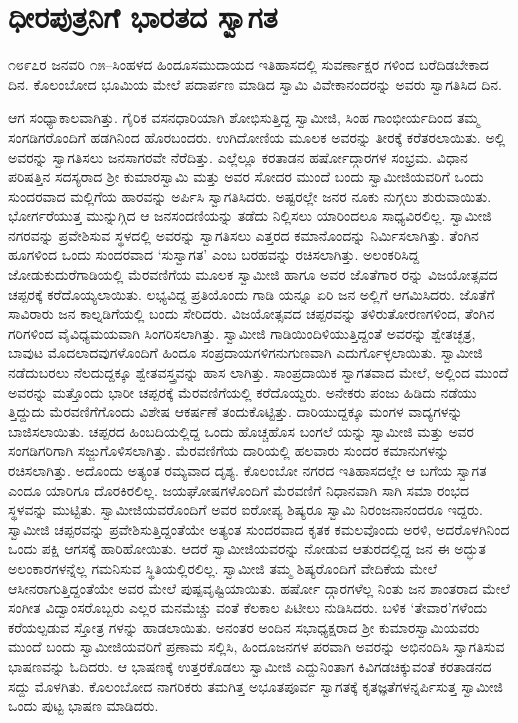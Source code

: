 
\chapter{ಧೀರಪುತ್ರನಿಗೆ ಭಾರತದ ಸ್ವಾಗತ}

\noindent

೧೮೯೭ರ ಜನವರಿ ೧೫–ಸಿಂಹಳದ ಹಿಂದೂಸಮುದಾಯದ ಇತಿಹಾಸದಲ್ಲಿ ಸುವರ್ಣಾಕ್ಷರ ಗಳಿಂದ ಬರೆದಿಡಬೇಕಾದ ದಿನ. ಕೊಲಂಬೋದ ಭೂಮಿಯ ಮೇಲೆ ಪದಾರ್ಪಣ ಮಾಡಿದ ಸ್ವಾಮಿ ವಿವೇಕಾನಂದರನ್ನು ಅವರು ಸ್ವಾಗತಿಸಿದ ದಿನ.

ಆಗ ಸಂಧ್ಯಾಕಾಲವಾಗಿತ್ತು. ಗೈರಿಕ ವಸನಧಾರಿಯಾಗಿ ಶೋಭಿಸುತ್ತಿದ್ದ ಸ್ವಾಮೀಜಿ, ಸಿಂಹ ಗಾಂಭೀರ್ಯದಿಂದ ತಮ್ಮ ಸಂಗಡಿಗರೊಂದಿಗೆ ಹಡಗಿನಿಂದ ಹೊರಬಂದರು. ಉಗಿದೋಣಿಯ ಮೂಲಕ ಅವರನ್ನು ತೀರಕ್ಕೆ ಕರೆತರಲಾಯಿತು. ಅಲ್ಲಿ ಅವರನ್ನು ಸ್ವಾಗತಿಸಲು ಜನಸಾಗರವೇ ನೆರೆದಿತ್ತು. ಎಲ್ಲೆಲ್ಲೂ ಕರತಾಡನ ಹರ್ಷೋದ್ಗಾರಗಳ ಸಂಭ್ರಮ. ವಿಧಾನ ಪರಿಷತ್ತಿನ ಸದಸ್ಯರಾದ ಶ್ರೀ ಕುಮಾರಸ್ವಾಮಿ ಮತ್ತು ಅವರ ಸೋದರ ಮುಂದೆ ಬಂದು ಸ್ವಾಮೀಜಿಯವರಿಗೆ ಒಂದು ಸುಂದರವಾದ ಮಲ್ಲಿಗೆಯ ಹಾರವನ್ನು ಅರ್ಪಿಸಿ ಸ್ವಾಗತಿಸಿದರು. ಅಷ್ಟರಲ್ಲೇ ಜನರ ನೂಕು ನುಗ್ಗಲು ಶುರುವಾಯಿತು. ಭೋರ್ಗರೆಯುತ್ತ ಮುನ್ನುಗ್ಗಿದ ಆ ಜನಸಂದಣಿಯನ್ನು ತಡೆದು ನಿಲ್ಲಿಸಲು ಯಾರಿಂದಲೂ ಸಾಧ್ಯವಿರಲಿಲ್ಲ. ಸ್ವಾಮೀಜಿ ನಗರವನ್ನು ಪ್ರವೇಶಿಸುವ ಸ್ಥಳದಲ್ಲಿ ಅವರನ್ನು ಸ್ವಾಗತಿಸಲು ಎತ್ತರದ ಕಮಾನೊಂದನ್ನು ನಿರ್ಮಿಸಲಾಗಿತ್ತು. ತೆಂಗಿನ ಹೂಗಳಿಂದ ಒಂದು ಸುಂದರವಾದ ‘ಸುಸ್ವಾಗತ’ ಎಂಬ ಬರಹವನ್ನು ರಚಿಸಲಾಗಿತ್ತು. ಅಲಂಕರಿಸಿದ್ದ ಜೋಡುಕುದುರೆಗಾಡಿಯಲ್ಲಿ ಮೆರವಣಿಗೆಯ ಮೂಲಕ ಸ್ವಾಮೀಜಿ ಹಾಗೂ ಅವರ ಜೊತೆಗಾರ ರನ್ನು ವಿಜಯೋತ್ಸವದ ಚಪ್ಪರಕ್ಕೆ ಕರೆದೊಯ್ಯಲಾಯಿತು. ಲಭ್ಯವಿದ್ದ ಪ್ರತಿಯೊಂದು ಗಾಡಿ ಯನ್ನೂ ಏರಿ ಜನ ಅಲ್ಲಿಗೆ ಆಗಮಿಸಿದರು. ಜೊತೆಗೆ ಸಾವಿರಾರು ಜನ ಕಾಲ್ನಡಿಗೆಯಲ್ಲಿ ಬಂದು ಸೇರಿದರು. ವಿಜಯೋತ್ಸವದ ಚಪ್ಪರವನ್ನು ತಳಿರುತೋರಣಗಳಿಂದ, ತೆಂಗಿನ ಗರಿಗಳಿಂದ ವೈವಿಧ್ಯಮಯವಾಗಿ ಸಿಂಗರಿಸಲಾಗಿತ್ತು. ಸ್ವಾಮೀಜಿ ಗಾಡಿಯಿಂದಿಳಿಯುತ್ತಿದ್ದಂತೆ ಅವರನ್ನು ಶ್ವೇತಚ್ಛತ್ರ, ಬಾವುಟ ಮೊದಲಾದವುಗಳೊಂದಿಗೆ ಹಿಂದೂ ಸಂಪ್ರದಾಯಗಳಿಗನುಗುಣವಾಗಿ ಎದುರ್ಗೊಳ್ಳಲಾಯಿತು. ಸ್ವಾಮೀಜಿ ನಡೆದುಬರಲು ನೆಲದುದ್ದಕ್ಕೂ ಶ್ವೇತವಸ್ತ್ರವನ್ನು ಹಾಸ ಲಾಗಿತ್ತು. ಸಾಂಪ್ರದಾಯಿಕ ಸ್ವಾಗತವಾದ ಮೇಲೆ, ಅಲ್ಲಿಂದ ಮುಂದೆ ಅವರನ್ನು ಮತ್ತೊಂದು ಭಾರೀ ಚಪ್ಪರಕ್ಕೆ ಮೆರವಣಿಗೆಯಲ್ಲಿ ಕರೆದೊಯ್ದರು. ಅನೇಕರು ಪಂಜು ಹಿಡಿದು ನಡೆಯು ತ್ತಿದ್ದುದು ಮೆರವಣಿಗೆಗೊಂದು ವಿಶೇಷ ಆಕರ್ಷಣೆ ತಂದುಕೊಟ್ಟಿತ್ತು. ದಾರಿಯುದ್ದಕ್ಕೂ ಮಂಗಳ ವಾದ್ಯಗಳನ್ನು ಬಾಜಿಸಲಾಯಿತು. ಚಪ್ಪರದ ಹಿಂಬದಿಯಲ್ಲಿದ್ದ ಒಂದು ಹೊಚ್ಚಹೊಸ ಬಂಗಲೆ ಯನ್ನು ಸ್ವಾಮೀಜಿ ಮತ್ತು ಅವರ ಸಂಗಡಿಗರಿಗಾಗಿ ಸಜ್ಜುಗೊಳಿಸಲಾಗಿತ್ತು. ಮೆರವಣಿಗೆಯ ದಾರಿಯಲ್ಲಿ ಹಲವಾರು ಸುಂದರ ಕಮಾನುಗಳನ್ನು ರಚಿಸಲಾಗಿತ್ತು. ಅದೊಂದು ಅತ್ಯಂತ ರಮ್ಯವಾದ ದೃಶ್ಯ. ಕೊಲಂಬೋ ನಗರದ ಇತಿಹಾಸದಲ್ಲೇ ಆ ಬಗೆಯ ಸ್ವಾಗತ ಎಂದೂ ಯಾರಿಗೂ ದೊರಕಿರಲಿಲ್ಲ. ಜಯಘೋಷಗಳೊಂದಿಗೆ ಮೆರವಣಿಗೆ ನಿಧಾನವಾಗಿ ಸಾಗಿ ಸಮಾ ರಂಭದ ಸ್ಥಳವನ್ನು ಮುಟ್ಟಿತು. ಸ್ವಾಮೀಜಿಯವರೊಂದಿಗೆ ಅವರ ಐರೋಪ್ಯ ಶಿಷ್ಯರೂ ಸ್ವಾಮಿ ನಿರಂಜನಾನಂದರೂ ಇದ್ದರು. ಸ್ವಾಮೀಜಿ ಚಪ್ಪರವನ್ನು ಪ್ರವೇಶಿಸುತ್ತಿದ್ದಂತೆಯೇ ಅತ್ಯಂತ ಸುಂದರವಾದ ಕೃತಕ ಕಮಲವೊಂದು ಅರಳಿ, ಅದರೊಳಗಿನಿಂದ ಒಂದು ಪಕ್ಷಿ ಆಗಸಕ್ಕೆ ಹಾರಿಹೋಯಿತು. ಆದರೆ ಸ್ವಾಮೀಜಿಯವರನ್ನು ನೋಡುವ ಆತುರದಲ್ಲಿದ್ದ ಜನ ಈ ಅದ್ಭುತ ಅಲಂಕಾರಗಳನ್ನೆಲ್ಲ ಗಮನಿಸುವ ಸ್ಥಿತಿಯಲ್ಲಿರಲಿಲ್ಲ. ಸ್ವಾಮೀಜಿ ತಮ್ಮ ಶಿಷ್ಯರೊಂದಿಗೆ ವೇದಿಕೆಯ ಮೇಲೆ ಆಸೀನರಾಗುತ್ತಿದ್ದಂತೆಯೇ ಅವರ ಮೇಲೆ ಪುಷ್ಪವೃಷ್ಟಿಯಾಯಿತು. ಹರ್ಷೋ ದ್ಗಾರಗಳೆಲ್ಲ ನಿಂತು ಜನ ಶಾಂತರಾದ ಮೇಲೆ ಸಂಗೀತ ವಿದ್ವಾಂಸರೊಬ್ಬರು ಎಲ್ಲರ ಮನಮೆಚ್ಚು ವಂತೆ ಕೆಲಕಾಲ ಪಿಟೀಲು ನುಡಿಸಿದರು. ಬಳಿಕ ‘ತೇವಾರ’ಗಳೆಂದು ಕರೆಯಲ್ಪಡುವ ಸ್ತೋತ್ರ ಗಳನ್ನು ಹಾಡಲಾಯಿತು. ಅನಂತರ ಅಂದಿನ ಸಭಾಧ್ಯಕ್ಷರಾದ ಶ್ರೀ ಕುಮಾರಸ್ವಾಮಿಯವರು ಮುಂದೆ ಬಂದು ಸ್ವಾಮೀಜಿಯವರಿಗೆ ಪ್ರಣಾಮ ಸಲ್ಲಿಸಿ, ಹಿಂದೂಜನಗಳ ಪರವಾಗಿ ಅವರನ್ನು ಅಭಿನಂದಿಸಿ ಸ್ವಾಗತಿಸುವ ಭಾಷಣವನ್ನು ಓದಿದರು. ಆ ಭಾಷಣಕ್ಕೆ ಉತ್ತರಕೊಡಲು ಸ್ವಾಮೀಜಿ ಎದ್ದುನಿಂತಾಗ ಕಿವಿಗಡಚಿಕ್ಕುವಂತೆ ಕರತಾಡನದ ಸದ್ದು ಮೊಳಗಿತು. ಕೊಲಂಬೋದ ನಾಗರಿಕರು ತಮಗಿತ್ತ ಅಭೂತಪೂರ್ವ ಸ್ವಾಗತಕ್ಕೆ ಕೃತಜ್ಞತೆಗಳನ್ನರ್ಪಿಸುತ್ತ ಸ್ವಾಮೀಜಿ ಒಂದು ಪುಟ್ಟ ಭಾಷಣ ಮಾಡಿದರು.

